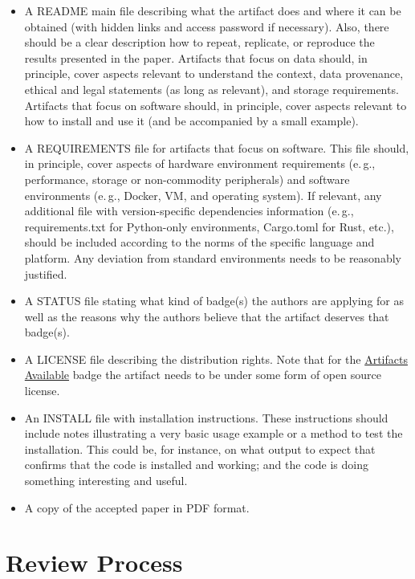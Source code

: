 \documentclass[twoside,a4paper]{refart}
\newcommand{\eg}{e.\,g.,\xspace}
\newcommand{\available}{\protect\hyperlink{available}{Artifacts Available}\xspace}
\begin{document}
\begin{itemize}
\item A \hypertarget{readme}{README} main file describing what the
  artifact does and where it can be obtained (with hidden links and
  access password if necessary). Also, there should be a clear
  description how to repeat, replicate, or reproduce the results
  presented in the paper. Artifacts that focus on data should, in
  principle, cover aspects relevant to understand the context, data
  provenance, ethical and legal statements (as long as relevant), and
  storage requirements. Artifacts that focus on software should, in
  principle, cover aspects relevant to how to install and use it (and
  be accompanied by a small example).
\item A \hypertarget{requirements}{REQUIREMENTS} file for artifacts
  that focus on software. This file should, in principle, cover
  aspects of hardware environment requirements (\eg performance,
  storage or non-commodity peripherals) and software environments (\eg
  Docker, VM, and operating system). Ιf relevant, any additional file
  with version-specific dependencies information (\eg requirements.txt
  for Python-only environments, Cargo.toml for Rust, etc.), should be
  included according to the norms of the specific language and
  platform. Any deviation from standard environments needs to be
  reasonably justified.
\item A \hypertarget{status}{STATUS} file stating what kind of
  badge(s) the authors are applying for as well as the reasons why the
  authors believe that the artifact deserves that badge(s).
\item A \hypertarget{license}{LICENSE} file describing the
  distribution rights. Note that for the \available badge the artifact
  needs to be under some form of open source license.
\item An \hypertarget{install}{INSTALL} file with installation
  instructions. These instructions should include notes illustrating a
  very basic usage example or a method to test the installation. This
  could be, for instance, on what output to expect that confirms that
  the code is installed and working; and the code is doing something
  interesting and useful.
\item A copy of the accepted paper in PDF format.

\end{itemize}

\section{Review Process}
\end{document}
